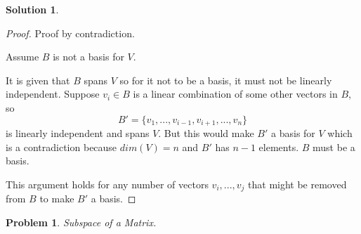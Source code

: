 \documentclass{article}
\newtheorem{problem}{Problem}
\theoremstyle{definition}
\newtheorem*{solution}{Solution}
\begin{document}
\begin{solution}

\begin{proof}
Proof by contradiction.

Assume $B$ is not a basis for $V$.

It is given that $B$ spans $V$ so for it not to be a basis, it must not be linearly independent.
Suppose $v_i\in B$ is a linear combination of some other vectors in $B$, so
\[B'=\{v_1,...,v_{i-1},v_{i+1},...,v_n\}\]
is linearly independent and spans $V$.
But this would make $B'$ a basis for $V$ which is a contradiction because $dim(V)=n$ and $B'$ has $n-1$ elements.
$B$ must be a basis.

This argument holds for any number of vectors $v_i,...,v_j$ that might be removed from $B$ to make $B'$ a basis.
\end{proof}

\end{solution}

\begin{problem}

Subspace of a Matrix.

\end{problem}
\end{document}
